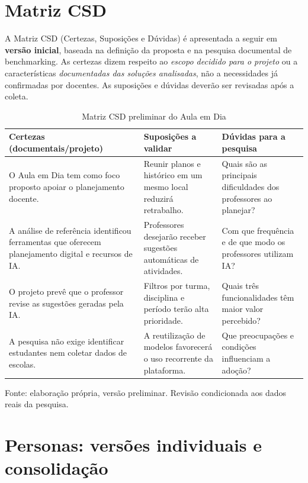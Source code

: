 \documentclass[12pt,a4paper,oneside]{report}
\begin{document}
\section{Matriz CSD}
A Matriz CSD (Certezas, Suposições e Dúvidas) é apresentada a seguir em \textbf{versão inicial}, baseada na definição da proposta e na pesquisa documental de benchmarking. As certezas dizem respeito ao \emph{escopo decidido para o projeto} ou a características \emph{documentadas das soluções analisadas}, não a necessidades já confirmadas por docentes. As suposições e dúvidas deverão ser revisadas após a coleta.
\begin{table}[htbp]
\centering
\caption{Matriz CSD preliminar do Aula em Dia}
\label{tab:csd-inicial}
\scriptsize
\renewcommand{\arraystretch}{1.35}
\begin{tabularx}{\textwidth}{@{}>{\RaggedRight\arraybackslash}X>{\RaggedRight\arraybackslash}X>{\RaggedRight\arraybackslash}X@{}}
\toprule
\textbf{Certezas (documentais/projeto)} & \textbf{Suposições a validar} & \textbf{Dúvidas para a pesquisa} \\
\midrule
O Aula em Dia tem como foco proposto apoiar o planejamento docente. & Reunir planos e histórico em um mesmo local reduzirá retrabalho. & Quais são as principais dificuldades dos professores ao planejar? \\
A análise de referência identificou ferramentas que oferecem planejamento digital e recursos de IA. & Professores desejarão receber sugestões automáticas de atividades. & Com que frequência e de que modo os professores utilizam IA? \\
O projeto prevê que o professor revise as sugestões geradas pela IA. & Filtros por turma, disciplina e período terão alta prioridade. & Quais três funcionalidades têm maior valor percebido? \\
A pesquisa não exige identificar estudantes nem coletar dados de escolas. & A reutilização de modelos favorecerá o uso recorrente da plataforma. & Que preocupações e condições influenciam a adoção? \\
\bottomrule
\end{tabularx}
\par\smallskip
\begin{minipage}{\textwidth}\footnotesize Fonte: elaboração própria, versão preliminar. Revisão condicionada aos dados reais da pesquisa.\end{minipage}
\end{table}


\section{Personas: versões individuais e consolidação}
\label{sec:personas}
\end{document}
